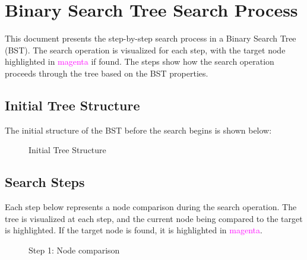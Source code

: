 \documentclass[10pt,a4paper]{article}
\begin{document}
\section*{Binary Search Tree Search Process}
This document presents the step-by-step search process in a Binary Search Tree (BST). The search operation is visualized for each step, with the target node highlighted in \textcolor{magenta}{magenta} if found. The steps show how the search operation proceeds through the tree based on the BST properties.

\subsection*{Initial Tree Structure}
The initial structure of the BST before the search begins is shown below:
\begin{figure}[h!]
\centering
\begin{minipage}{0.8\textwidth}
    \centering
    \caption{Initial Tree Structure}
\end{minipage}
\vspace{1cm}
\end{figure}

\newpage
\subsection*{Search Steps}
Each step below represents a node comparison during the search operation. The tree is visualized at each step, and the current node being compared to the target is highlighted. If the target node is found, it is highlighted in \textcolor{magenta}{magenta}.

\begin{figure}[h!]
\centering
\begin{minipage}{0.8\textwidth}
    \centering
    \caption{Step 1: Node comparison}
\end{minipage}
\vspace{1cm}
\end{figure}
\end{document}
